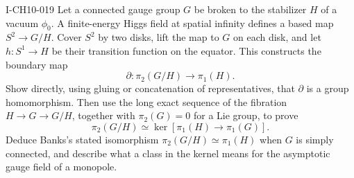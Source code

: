 \begin{exercise}{I-CH10-019}
Let a connected gauge group $G$ be broken to the stabilizer $H$ of a vacuum
$\phi_0$.  A finite-energy Higgs field at spatial infinity defines a based map
$S^2\to G/H$.  Cover $S^2$ by two disks, lift the map to $G$ on each disk,
and let $h:S^1\to H$ be their transition function on the equator.  This
constructs the boundary map
\[
  \partial:\pi_2(G/H)\longrightarrow\pi_1(H).
\]
Show directly, using gluing or concatenation of representatives, that
$\partial$ is a group homomorphism.  Then use the long exact sequence of the
fibration $H\to G\to G/H$, together with $\pi_2(G)=0$ for a Lie group, to
prove
\[
  \pi_2(G/H)\simeq
  \ker\!\left[\pi_1(H)\longrightarrow\pi_1(G)\right].
\]
Deduce Banks's stated isomorphism $\pi_2(G/H)\simeq\pi_1(H)$ when $G$ is
simply connected, and describe what a class in the kernel means for the
asymptotic gauge field of a monopole.
\end{exercise}
